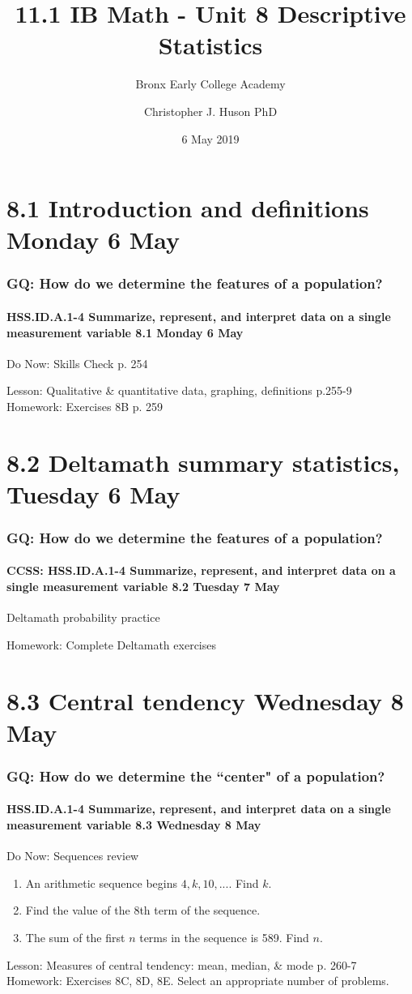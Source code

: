 \documentclass{beamer}
\title{11.1 IB Math - Unit 8 Descriptive Statistics}
\subtitle{Bronx Early College Academy}
\author{Christopher J. Huson PhD}
\date{6 May 2019}
\begin{document}
  \frame{\titlepage}
  \section[Outline]{}
  \frame{\tableofcontents}

\section{8.1 Introduction and definitions Monday 6 May}
  \frame
  {
    \frametitle{GQ: How do we determine the features of a population?}
    \framesubtitle{HSS.ID.A.1-4 Summarize, represent, and interpret data on a single measurement variable \hfill \alert{8.1 Monday 6 May}}

    \begin{block}{Do Now: Skills Check p. 254}
    \end{block}
    Lesson: Qualitative \& quantitative data, graphing, definitions p.255-9\\[1cm]
    Homework: Exercises 8B p. 259
  }

\section{8.2 Deltamath summary statistics, Tuesday 6 May}
  \frame
  {
    \frametitle{GQ: How do we determine the features of a population?}
    \framesubtitle{CCSS: HSS.ID.A.1-4 Summarize, represent, and interpret data on a single measurement variable \hfill \alert{8.2 Tuesday 7 May}}

    \begin{block}{Deltamath probability practice}
    \end{block}
    Homework: Complete Deltamath exercises
  }

\section{8.3 Central tendency Wednesday 8 May}
  \frame
  {
    \frametitle{GQ: How do we determine the ``center" of a population?}
    \framesubtitle{HSS.ID.A.1-4 Summarize, represent, and interpret data on a single measurement variable \hfill \alert{8.3 Wednesday 8 May}}

    \begin{block}{Do Now: Sequences review}
      \begin{enumerate}
        \item An arithmetic sequence begins $4, k, 10, ...$. Find $k$.
        \item Find the value of the 8th term of the sequence.
        \item The sum of the first $n$ terms in the sequence is 589. Find $n$.
    \end{enumerate}
    \end{block}
    Lesson: Measures of central tendency: mean, median, \& mode p. 260-7\\[0.5cm]
    Homework: Exercises 8C, 8D, 8E. Select an appropriate number of problems.
  }
\end{document}
